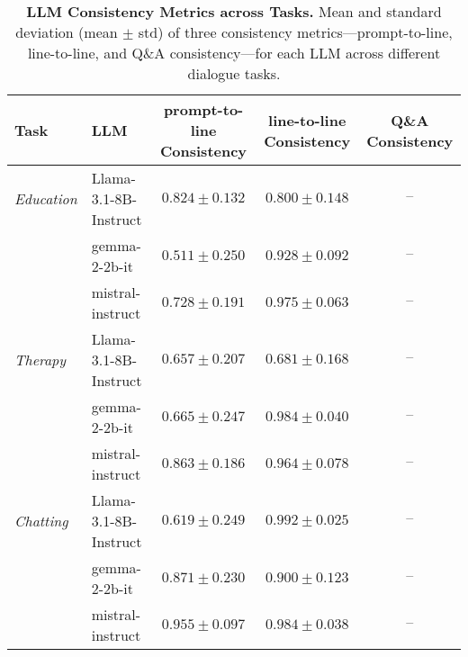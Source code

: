 
\begin{table*}[t]
    \centering
    \scriptsize
    \begin{tabular}{l l c c c}
        \toprule
        \textbf{Task} & \textbf{LLM} 
        & \textbf{prompt-to-line Consistency} 
        & \textbf{line-to-line Consistency} 
        & \textbf{Q\&A Consistency} \\
        \midrule
\textit{Education} & Llama-3.1-8B-Instruct & $0.824 \pm 0.132$ & $0.800 \pm 0.148$ & $\text{--}$ \\
 & gemma-2-2b-it & $0.511 \pm 0.250$ & $0.928 \pm 0.092$ & $\text{--}$ \\
 & mistral-instruct & $0.728 \pm 0.191$ & $0.975 \pm 0.063$ & $\text{--}$ \\
\textit{Therapy} & Llama-3.1-8B-Instruct & $0.657 \pm 0.207$ & $0.681 \pm 0.168$ & $\text{--}$ \\
 & gemma-2-2b-it & $0.665 \pm 0.247$ & $0.984 \pm 0.040$ & $\text{--}$ \\
 & mistral-instruct & $0.863 \pm 0.186$ & $0.964 \pm 0.078$ & $\text{--}$ \\
\textit{Chatting} & Llama-3.1-8B-Instruct & $0.619 \pm 0.249$ & $0.992 \pm 0.025$ & $\text{--}$ \\
 & gemma-2-2b-it & $0.871 \pm 0.230$ & $0.900 \pm 0.123$ & $\text{--}$ \\
 & mistral-instruct & $0.955 \pm 0.097$ & $0.984 \pm 0.038$ & $\text{--}$ \\
        \bottomrule
    \end{tabular}
    \caption{\textbf{LLM Consistency Metrics across Tasks.} 
    Mean and standard deviation (mean $\pm$ std) of three consistency metrics—prompt-to-line, line-to-line, and Q\&A consistency—for each LLM across different dialogue tasks.}
    \label{tab:llm_consistency}
\end{table*}
